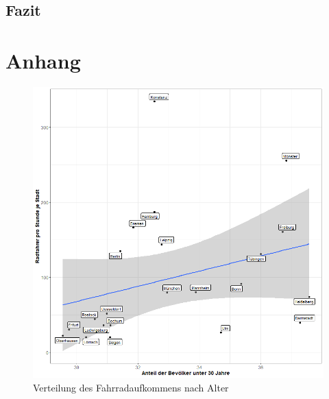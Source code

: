 \documentclass[a4paper,12pt]{thesis}
\begin{document}
\section{Fazit}

\chapter{Anhang}

\begin{figure}[!ht]
	\centering
	\includegraphics[width=\textwidth]{Plots/plot03.png}
	\caption{Verteilung des Fahrradaufkommens nach Alter}
	\label{Alter}
\end{figure}
\end{document}
